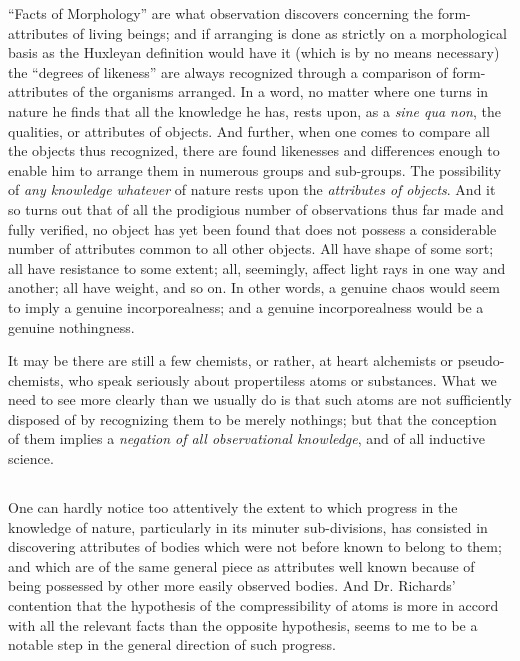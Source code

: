 \documentclass[a4paper, 11pt, oneside, polutonikogreek, english]{article}
\begin{document}
``Facts of Morphology'' are what observation discovers concerning the form-attributes of living beings; and if arranging is done as strictly on a morphological basis as the Huxleyan definition would have it (which is by no means necessary) the ``degrees of likeness'' are always recognized through a comparison of form-attributes of the organisms arranged. In a word, no matter where one turns in nature he finds that all the knowledge he has, rests upon, as a \emph{sine qua non}, the qualities, or attributes of objects. And further, when one comes to compare all the objects thus recognized, there are found likenesses and differences enough to enable him to arrange them in numerous groups and sub-groups. The possibility of \emph{any knowledge whatever} of nature rests upon the \emph{attributes of objects}. And it so turns out that of all the prodigious number of observations thus far made and fully verified, no object has yet been found that does not possess a considerable number of attributes common to all other objects. All have shape of some sort; all have resistance to some extent; all, seemingly, affect light rays in one way and another; all have weight, and so on. In other words, a genuine chaos would seem to imply a genuine incorporealness; and a genuine incorporealness would be a genuine nothingness.

It may be there are still a few chemists, or rather, at heart alchemists or pseudo-chemists, who speak seriously about propertiless atoms or substances. What we need to see more clearly than we usually do is that such atoms are not sufficiently disposed of by recognizing them to be merely nothings; but that the conception of them implies a \emph{negation of all observational knowledge}, and of all inductive science.

\subsection{}
\paragraph{}
One can hardly notice too attentively the extent to which progress in the knowledge of nature, particularly in its minuter sub-divisions, has consisted in discovering attributes of bodies which were not before known to belong to them; and which are of the same general piece as attributes well known because of being possessed by other more easily observed bodies. And Dr. Richards' contention that the hypothesis of the compressibility of atoms is more in accord with all the relevant facts than the opposite hypothesis, seems to me to be a notable step in the general direction of such progress.
\end{document}
